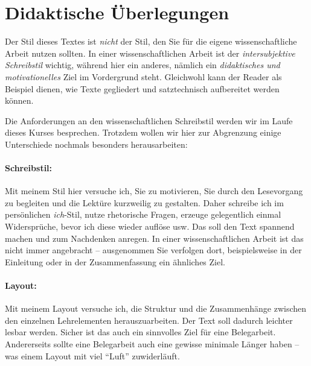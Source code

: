 \documentclass[a4paper]{article}%
\begin{document}


\clearpage



\section{Didaktische Überlegungen}

Der Stil dieses Textes ist \textit{nicht} der Stil, den Sie für die eigene wissenschaftli\-che
Arbeit nutzen sollten. In einer wissenschaftlichen Arbeit ist der \textit{intersubjektive Schreibstil}
wichtig, 
während hier ein anderes, nämlich ein \textit{didaktisches und motivationelles} Ziel im Vordergrund steht.
Gleichwohl kann der Reader als Beispiel dienen, wie Texte gegliedert und satztechnisch
aufbereitet werden können.

Die Anforderungen an den
wissenschaftlichen Schreibstil werden wir im Laufe dieses Kurses besprechen.
Trotzdem wollen wir hier zur Abgrenzung einige Unterschiede nochmals besonders herausarbeiten:

\paragraph{Schreibstil:}
Mit meinem Stil hier versuche ich, Sie zu motivieren, Sie durch den Lesevorgang zu begleiten und die
Lektüre kurzweilig zu gestalten. Daher schreibe ich im persönlichen \textit{ich}-Stil,
nutze rhetorische Fragen, erzeuge gelegentlich einmal Widersprüche, bevor ich diese wieder auflöse usw.
Das soll den Text spannend machen und zum Nachdenken anregen.
In einer wissenschaftlichen Arbeit ist das nicht immer angebracht -- ausgenommen Sie verfolgen dort,
beispielsweise in der Einleitung oder in der Zusammenfassung ein ähnliches Ziel.

\paragraph{Layout:} Mit meinem Layout versuche ich, die Struktur und die Zusammenhänge
zwischen den einzelnen Lehrelementen herauszuarbeiten. Der Text soll dadurch leichter lesbar
werden. Sicher ist das auch ein sinnvolles Ziel für eine Belegarbeit. Andererseits sollte
eine Belegarbeit auch eine gewisse minimale Länger haben -- was einem Layout mit viel \enquote{Luft}
zuwiderläuft.
\end{document}
